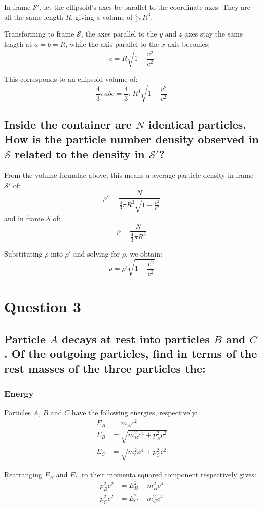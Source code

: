 \documentclass[a4paper]{scrartcl}
\begin{document}
In frame \(\mathcal{S}'\), let the ellipsoid's axes be parallel to the coordinate axes. They are all the same length \(R\), giving a volume of \(\frac{4}{3} \pi R^3\).

Transforming to frame \(\mathcal{S}\), the axes parallel to the \(y\) and \(z\) axes stay the same length at \(a = b = R\), while the axis parallel to the \(x\) axis becomes:
\[c = R \sqrt{1 - \frac{v^2}{c^2}}\]

This corresponds to an ellipsoid volume of:
\[\frac{4}{3} \pi a b c = \frac{4}{3} \pi R^3 \sqrt{1 - \frac{v^2}{c^2}}\]

\subsection{Inside the container are \(N\) identical particles. How is the particle number density observed in \(\mathcal{S}\) related to the density in \(\mathcal{S}'\)?}
From the volume formulae above, this means a average particle density in frame \(\mathcal{S}'\) of:
\[\rho' = \frac{N}{\frac{4}{3} \pi R^3 \sqrt{1 - \frac{v^2}{c^2}}}\]
and in frame \(\mathcal{S}\) of:
\[\rho = \frac{N}{\frac{4}{3} \pi R^3}\]

Substituting \(\rho\) into \(\rho'\) and solving for \(\rho\), we obtain:
\[\rho = \rho' \sqrt{1 - \frac{v^2}{c^2}}\]

\section{Question 3}
\subsection{Particle \(A\) decays at rest into particles \(B\) and \(C\). Of the outgoing particles, find in terms of the rest masses of the three particles the:}
\subsubsection{Energy}
Particles \(A\), \(B\) and \(C\) have the following energies, respectively:
\begin{align*}
    E_A &= m_A c^2 \\
    E_B &= \sqrt{m_B^2 c^4 + p_B^2 c^2} \\
    E_C &= \sqrt{m_C^2 c^4 + p_C^2 c^2}
\end{align*}

Rearranging \(E_B\) and \(E_C\) to their momenta squared component respectively gives:
\begin{align*}
    p_B^2 c^2 &= E_B^2 - m_B^2 c^4 \\
    p_C^2 c^2 &= E_C^2 - m_C^2 c^4
\end{align*}
\end{document}

